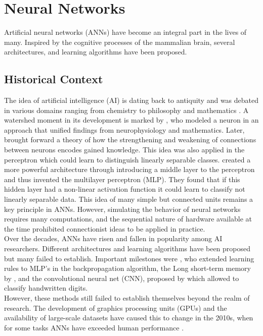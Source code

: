 \documentclass[a4paper,cleardoubleempty,BCOR1cm, 11pt]{report}
\begin{document}
\section{Neural Networks}
Artificial neural networks (ANNs) have become an integral part in the lives of many. Inspired by the cognitive processes of the mammalian brain, several architectures, and learning algorithms have been proposed.

\subsection{Historical Context}
The idea of artificial intelligence (AI) is dating back to antiquity and was debated in various domains ranging from chemistry \cite{o1994alchemical} to philosophy and mathematics \cite{leibnizdissertatio}. A watershed moment in its development is marked by \citet{mcculloch1943logical}, who modeled a neuron in an approach that unified findings from neurophysiology and mathematics. Later, \citet{hebb19680} brought forward a theory of how the strengthening and weakening of connections between neurons encodes gained knowledge.  This idea was also applied in the perceptron \cite{rosenblatt1960perceptron} which could learn to distinguish linearly separable classes. 
\citet{marvin1969perceptrons} created a more powerful architecture through introducing a middle layer to the perceptron and thus invented the multilayer perceptron (MLP). They found that if this hidden layer had a non-linear activation function it could learn to classify not linearly separable data. This idea of many simple but connected units remains a key principle in ANNs.
However, simulating the behavior of neural networks requires many computations, and the sequential nature of hardware available at the time prohibited connectionist ideas to be applied in practice.\\
Over the decades, ANNs have risen and fallen in popularity among AI researchers. Different architectures and learning algorithms have been proposed but many failed to establish. Important milestones were \citet{rumelhart1986learning}, who extended learning rules to MLP's in the backpropagation algorithm, the Long short-term memory by \citet{hochreiter1997long}, and the convolutional neural net (CNN), proposed by \citet{lecun1995convolutional} which allowed to classify handwritten digits.\\
However, these methods still failed to establish themselves beyond the realm of research. The development of graphics processing units (GPUs) and the availability of large-scale datasets have caused this to change in the 2010s, when for some tasks ANNs have exceeded human performance \cite{ILSVRC15}.
\end{document}
